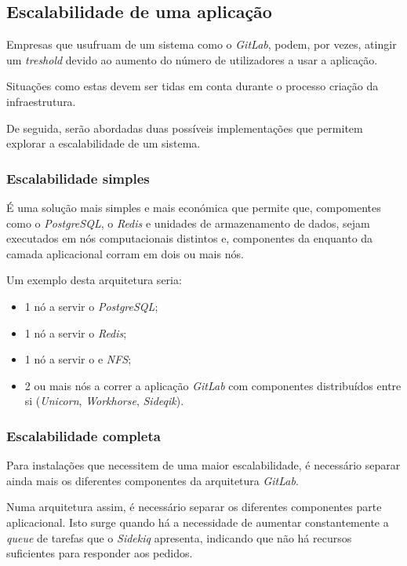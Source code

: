\documentclass[12pt,a4paper]{article}
\begin{document}
\iffalse
\subsection{Escalabilidade de uma aplicação}

Empresas que usufruam de um sistema como o \emph{GitLab}, podem, por vezes, atingir um \emph{treshold} devido ao aumento do número de utilizadores a usar a aplicação.

Situações como estas devem ser tidas em conta durante o processo criação da infraestrutura. 

De seguida, serão abordadas duas possíveis implementações que permitem explorar a escalabilidade de um sistema.

\subsubsection{Escalabilidade simples}

É uma solução mais simples e mais económica que permite que, compomentes como o \emph{PostgreSQL}, o \emph{Redis} e unidades de armazenamento de dados, sejam executados em nós computacionais distintos e, componentes da enquanto da camada aplicacional corram em dois ou mais nós.

Um exemplo desta arquitetura seria:
\begin{itemize}
    \item 1 nó a servir o \emph{PostgreSQL};
    \item 1 nó a servir o \emph{Redis};
    \item 1 nó a servir o  e \emph{NFS};
    \item 2 ou mais nós a correr a aplicação \emph{GitLab} com componentes distribuídos entre si (\emph{Unicorn}, \emph{Workhorse}, \emph{Sideqik}).
\end{itemize}


\subsubsection{Escalabilidade completa}

Para instalações que necessitem de uma maior escalabilidade, é necessário separar ainda mais os diferentes componentes da arquitetura \emph{GitLab}.

Numa arquitetura assim, é necessário separar os diferentes componentes parte aplicacional. Isto surge quando há a necessidade de aumentar constantemente a \emph{queue} de tarefas que o \emph{Sidekiq} apresenta, indicando que não há recursos suficientes para responder aos pedidos.
\end{document}

